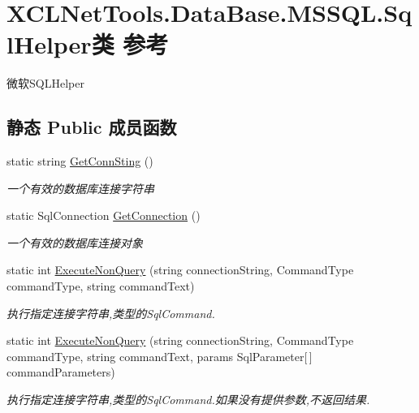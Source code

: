 \hypertarget{class_x_c_l_net_tools_1_1_data_base_1_1_m_s_s_q_l_1_1_sql_helper}{}\section{X\+C\+L\+Net\+Tools.\+Data\+Base.\+M\+S\+S\+Q\+L.\+Sql\+Helper类 参考}
\label{class_x_c_l_net_tools_1_1_data_base_1_1_m_s_s_q_l_1_1_sql_helper}


微软\+S\+Q\+L\+Helper  


\subsection*{静态 Public 成员函数}
\begin{DoxyCompactItemize}
\item 
static string \hyperlink{class_x_c_l_net_tools_1_1_data_base_1_1_m_s_s_q_l_1_1_sql_helper_ae29b8af5f96ea8dd6c13c6955ffa7a6e}{Get\+Conn\+Sting} ()
\begin{DoxyCompactList}\small\item\em 一个有效的数据库连接字符串 \end{DoxyCompactList}\item 
static Sql\+Connection \hyperlink{class_x_c_l_net_tools_1_1_data_base_1_1_m_s_s_q_l_1_1_sql_helper_ad00003a2bc9f2d3feb548f522b5737f2}{Get\+Connection} ()
\begin{DoxyCompactList}\small\item\em 一个有效的数据库连接对象 \end{DoxyCompactList}\item 
static int \hyperlink{class_x_c_l_net_tools_1_1_data_base_1_1_m_s_s_q_l_1_1_sql_helper_a6f9f121a620f114867ec766f5416ade8}{Execute\+Non\+Query} (string connection\+String, Command\+Type command\+Type, string command\+Text)
\begin{DoxyCompactList}\small\item\em 执行指定连接字符串,类型的\+Sql\+Command. \end{DoxyCompactList}\item 
static int \hyperlink{class_x_c_l_net_tools_1_1_data_base_1_1_m_s_s_q_l_1_1_sql_helper_a8ba53c4b48eee0977a823b986d4f15a8}{Execute\+Non\+Query} (string connection\+String, Command\+Type command\+Type, string command\+Text, params Sql\+Parameter\mbox{[}$\,$\mbox{]} command\+Parameters)
\begin{DoxyCompactList}\small\item\em 执行指定连接字符串,类型的\+Sql\+Command.\+如果没有提供参数,不返回结果. \end{DoxyCompactList}\item 

\end{DoxyCompactItemize}
